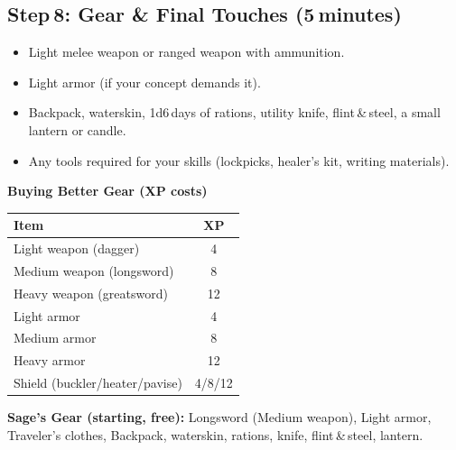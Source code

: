 \documentclass[10pt]{article}
\begin{document}
\subsection*{Step 8: Gear \& Final Touches (5 minutes)}
\begin{itemize}
  \item Light melee weapon or ranged weapon with ammunition.
  \item Light armor (if your concept demands it).
  \item Backpack, waterskin, 1d6 days of rations, utility knife, flint & steel, a small lantern or candle.
  \item Any tools required for your skills (lockpicks, healer's kit, writing materials).
\end{itemize}

\textbf{Buying Better Gear (XP costs)}  

\begin{tabular}{p{4cm} c}
    \toprule
    \textbf{Item} & \textbf{XP}\\
    \midrule
    Light weapon (dagger) & 4 \\
    Medium weapon (longsword) & 8 \\
    Heavy weapon (greatsword) & 12 \\
    Light armor & 4 \\
    Medium armor & 8 \\
    Heavy armor & 12 \\
    Shield (buckler/heater/pavise) & 4/8/12 \\
    \bottomrule
\end{tabular}

\textbf{Sage's Gear (starting, free):}
Longsword (Medium weapon), Light armor, Traveler's clothes, Backpack, waterskin, rations, knife, flint & steel, lantern.
\end{document}
